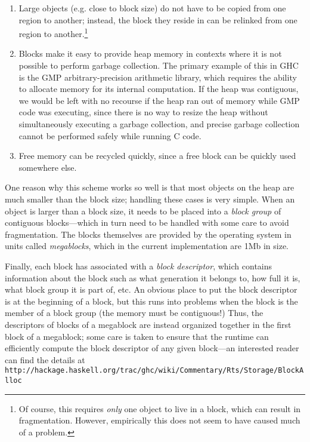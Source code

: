 \begin{enumerate}
    \item Large objects (e.g. close to block size) do not have to be copied from one region to
        another; instead, the block they reside in can be relinked from
        one region to another.\footnote{Of course, this requires \emph{only}
        one object to live in a block, which can result in fragmentation.
        However, empirically this does not seem to have caused much of a problem.}
    \item Blocks make it easy to provide heap memory in contexts where it is
        not possible to perform garbage collection.  The primary example of this
        in GHC is the GMP arbitrary-precision arithmetic library, which requires
        the ability to allocate memory for its internal computation.  If the heap
        was contiguous, we would be left with no recourse if the heap ran out
        of memory while GMP code was executing, since there is no way to resize
        the heap without simultaneously executing a garbage collection, and
        precise garbage collection cannot be performed safely while running C code.
    \item Free memory can be recycled quickly, since a free block can be quickly
        used somewhere else.
\end{enumerate}

One reason why this scheme works so well is that most objects on the
heap are much smaller than the block size; handling these cases is very
simple.  When an object is larger than a block size, it needs to be
placed into a \emph{block group} of contiguous blocks---which in turn
need to be handled with some care to avoid fragmentation.  The blocks
themselves are provided by the operating system in units called
\emph{megablocks}, which in the current implementation are 1Mb in size.

Finally, each block has associated with a \emph{block descriptor}, which
contains information about the block such as what generation it belongs to, how full it is, what block
group it is part of, etc.  An obvious place to put the block descriptor
is at the beginning of a block, but this runs into problems when the block
is the member of a block group (the memory must be contiguous!)
Thus, the descriptors of blocks of a megablock are instead organized together
in the first block of a megablock; some care is taken to ensure that the
runtime can efficiently compute the block descriptor of any given block---an
interested reader can find the details at \verb|http://hackage.haskell.org/trac/ghc/wiki/Commentary/Rts/Storage/BlockAlloc|
\XXX

